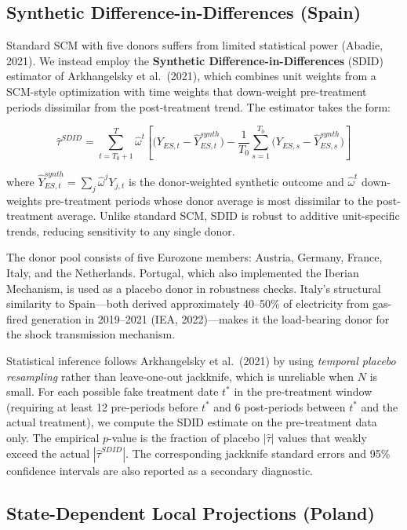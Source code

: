 \documentclass[12pt, a4paper]{article}
\begin{document}
\subsection{Synthetic Difference-in-Differences (Spain)}

Standard SCM with five donors suffers from limited statistical power (Abadie, 2021). We instead employ the \textbf{Synthetic Difference-in-Differences} (SDID) estimator of Arkhangelsky et al.\ (2021), which combines unit weights from a SCM-style optimization with time weights that down-weight pre-treatment periods dissimilar from the post-treatment trend. The estimator takes the form:

\[
\hat{\tau}^{SDID} = \sum_{t=T_0+1}^{T} \hat{\omega}^t \left[
  \bigl(Y_{ES,t} - \hat{Y}_{ES,t}^{synth}\bigr)
  - \frac{1}{T_0}\sum_{s=1}^{T_0} \bigl(Y_{ES,s} - \hat{Y}_{ES,s}^{synth}\bigr)
\right]
\]

where $\hat{Y}_{ES,t}^{synth} = \sum_j \hat{\omega}^j Y_{j,t}$ is the donor-weighted synthetic outcome and $\hat{\omega}^t$ down-weights pre-treatment periods whose donor average is most dissimilar to the post-treatment average. Unlike standard SCM, SDID is robust to additive unit-specific trends, reducing sensitivity to any single donor.

The donor pool consists of five Eurozone members: Austria, Germany, France, Italy, and the Netherlands. Portugal, which also implemented the Iberian Mechanism, is used as a placebo donor in robustness checks. Italy's structural similarity to Spain---both derived approximately 40--50\% of electricity from gas-fired generation in 2019--2021 (IEA, 2022)---makes it the load-bearing donor for the shock transmission mechanism.

Statistical inference follows Arkhangelsky et al.\ (2021) by using \textit{temporal placebo resampling} rather than leave-one-out jackknife, which is unreliable when $N$ is small. For each possible fake treatment date $t^*$ in the pre-treatment window (requiring at least 12 pre-periods before $t^*$ and 6 post-periods between $t^*$ and the actual treatment), we compute the SDID estimate on the pre-treatment data only. The empirical $p$-value is the fraction of placebo $|\hat{\tau}|$ values that weakly exceed the actual $|\hat{\tau}^{SDID}|$. The corresponding jackknife standard errors and 95\% confidence intervals are also reported as a secondary diagnostic.


\subsection{State-Dependent Local Projections (Poland)}
\end{document}
